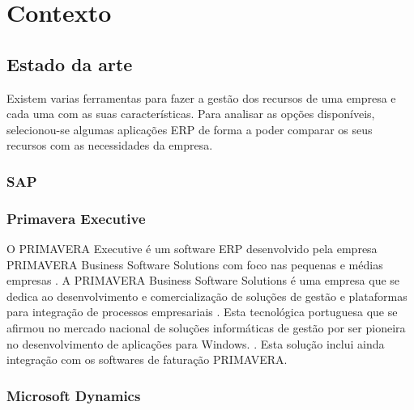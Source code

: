 \chapter{Contexto} 
\label{cap:2}

\section{Estado da arte}
Existem varias ferramentas para fazer a gestão dos recursos de uma empresa e cada uma com as suas características. Para analisar as opções disponíveis, selecionou-se algumas aplicações ERP de forma a poder comparar os seus recursos com as necessidades da empresa.

\subsection{SAP}


\subsection{Primavera Executive}
O PRIMAVERA Executive é um software ERP desenvolvido pela empresa PRIMAVERA Business Software Solutions com foco nas pequenas e médias empresas \cite{PRIMAVERABSS}. A PRIMAVERA Business Software Solutions é uma empresa que se dedica ao desenvolvimento e comercialização de soluções de gestão e plataformas para integração de processos empresariais \cite{Wikipediaa}. Esta tecnológica portuguesa que se afirmou no mercado nacional de soluções informáticas de gestão por ser pioneira no desenvolvimento de aplicações para Windows. \cite{Wikipediaa}.
Esta solução inclui ainda integração com os softwares de faturação PRIMAVERA.

\subsection{Microsoft Dynamics}


